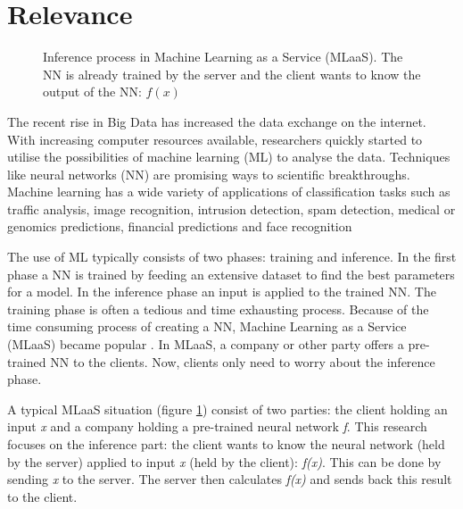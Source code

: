 \documentclass[../thesis.tex]{subfiles}
\begin{document}
\section{Relevance}
\label{section:relevance}
\begin{figure}
    \centering
       
    \caption{Inference process in Machine Learning as a Service (MLaaS). The NN is already trained by the server and the client wants to know the output of the NN: $f(x)$}
    \label{fig:mlaas}
\end{figure}
The recent rise in Big Data has increased the data exchange on the internet. With increasing computer resources available, researchers quickly started to utilise the possibilities of machine learning (ML) to analyse the data.  Techniques like neural networks (NN) are promising ways to scientific breakthroughs. Machine learning has a wide variety of applications of classification tasks such as traffic analysis, image recognition, intrusion detection,  spam detection, medical or genomics predictions,  financial predictions and face recognition \parencite{dowlin2017,islam2011, bachrach16, kaiming215}

The use of ML typically consists of two phases: training and inference. In the first phase a NN is trained by feeding an extensive dataset to find the best parameters for a model. In the inference phase an input is applied to the trained NN. The training phase is often a tedious and time exhausting process. Because of the time consuming process of creating a NN, Machine Learning as a Service (MLaaS) became popular \parencite{ribeiro2015mlaasml}. In MLaaS, a company or other party offers a pre-trained NN to the clients. Now, clients only need to worry about the inference phase.

A typical MLaaS situation (figure \ref{fig:mlaas}) consist of two parties: the client holding an input \textit{x} and a company holding a pre-trained neural network \textit{f}. This research focuses on the inference part: the client wants to know the neural network (held by the server) applied to input \textit{x} (held by the client): \textit{f(x)}. This can be done by sending \textit{x} to the server. The server then calculates \textit{f(x)} and sends back this result to the client.

\end{document}
